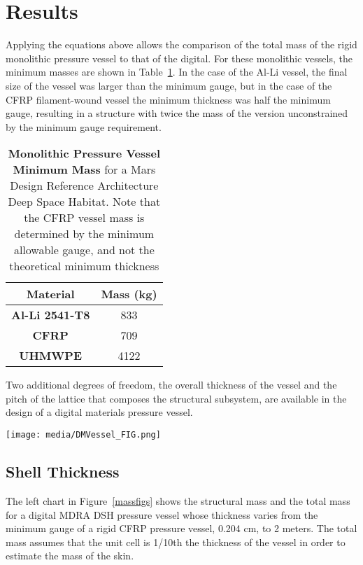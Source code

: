 \documentclass[twocolumn,letterpaper]{IEEEAerospaceCLS}  %
\begin{document}
\section{Results}
Applying the equations above allows the comparison of the total mass of the rigid monolithic pressure vessel to that of the digital. For these monolithic vessels, the minimum masses are shown in Table~\ref{RigidMasses}. In the case of the Al-Li vessel, the final size of the vessel was larger than the minimum gauge, but in the case of the CFRP filament-wound vessel the minimum thickness was half the minimum gauge, resulting in a structure with twice the mass of the version unconstrained by the minimum gauge requirement. 

\begin{table}
\renewcommand{\arraystretch}{1.3}
\caption{{\bf Monolithic Pressure Vessel Minimum Mass} for a Mars Design Reference Architecture Deep Space Habitat. Note that the CFRP vessel mass is determined by the minimum allowable gauge, and not the theoretical minimum thickness}
\label{RigidMasses}
\centering
\begin{tabular}{|c|c|}
\hline
\bfseries Material &\bfseries Mass (kg)  \\
\hline\hline
{\bf Al-Li 2541-T8} & 833 \\
{\bf CFRP} &  709 \\
{\bf UHMWPE} & 4122 \\
\hline
\end{tabular}
\end{table}

Two additional degrees of freedom, the overall thickness of the vessel and the pitch of the lattice that composes the structural subsystem, are available in the design of a digital materials pressure vessel.

\begin{figure*}\label{massfigs}
\centering
\texttt{[image: media/DMVessel\_FIG.png]}\\
\caption{\textbf{Comparison of a rigid CFRP and Digital CFRP/UHMWPE pressure vessel. The left plot shows the total mass of a vessel with changing thickness, assuming that the unit cell of the structure is one-tenth the thickness. The right plot shows the effect of decreasing this unit cell size on the total mass of the digital pressure vessel and the overall complexity of the structure.}} 
\end{figure*}

\subsection{Shell Thickness}
The left chart in Figure~\ref{massfigs} shows the structural mass and the total mass for a digital MDRA DSH pressure vessel whose thickness varies from the minimum gauge of a rigid CFRP pressure vessel, 0.204 cm, to 2 meters. The total mass assumes that the unit cell is 1/10th the thickness of the vessel in order to estimate the mass of the skin.
\end{document}
